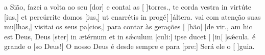 {    { a Sião, fazei a volta ao seu [dor] e contai as [ ]{tor}res.},
  {te corda vestra in virtúte [ius,] et percúrrite domos [ius,] ut enarrétis in progé[ ]{ál}tera.}%
    {vai com atenção suas mu[lhas,] visitai os seus pa[cios,] para contar às gerações [ ]{hão}[ ]{de} vir.},
  {am hic est Deus, Deus [ster] in ætérnum et in sǽculum [culi:] ipse ducet [ ]{in}[ ]{sǽ}cula.}%
    { é grande o [so Deus!] O nosso Deus é desde sempre e para [pre:] Será ele o [ ]{gui}a.}
}